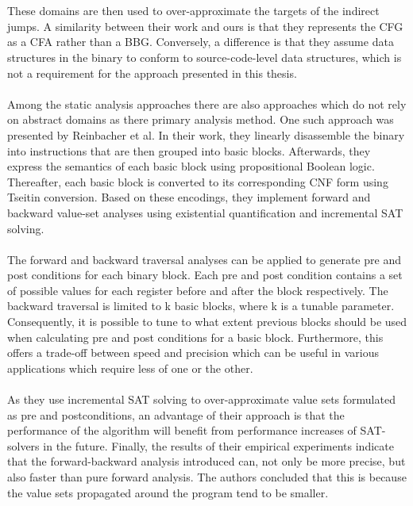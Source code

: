 \documentclass{kththesis}
\begin{document}
\\ \\
These domains are then used to over-approximate the targets of the indirect jumps. A similarity between their work and ours is that they represents the CFG as a CFA rather than a BBG. Conversely, a difference is that they assume data structures in the binary to conform to source-code-level data structures, which is not a requirement for the approach presented in this thesis. 
\\ \\ 
Among the static analysis approaches there are also approaches which do not rely on abstract domains as there primary analysis method. One such approach was presented by Reinbacher et al\cite{preciseCFGBoolean}. In their work, they linearly disassemble the binary into instructions that are then grouped into basic blocks. Afterwards, they express the semantics of each basic block using propositional Boolean logic. Thereafter, each basic block is converted to its corresponding CNF form using Tseitin conversion. Based on these encodings, they implement forward and backward value-set analyses using existential quantification and incremental SAT solving.
\\ \\
The forward and backward traversal analyses can be applied to generate pre and post conditions for each binary block. Each pre and post condition contains a set of possible values for each register before and after the block respectively. The backward traversal is limited to k basic blocks, where k is a tunable parameter. Consequently, it is possible to tune to what extent previous blocks should be used when calculating pre and post conditions for a basic block. Furthermore, this offers a trade-off between speed and precision which can be useful in various applications which require less of one or the other.
\\ \\
As they use incremental SAT solving to over-approximate value sets formulated as pre and postconditions, an advantage of their approach is that the performance of the algorithm will benefit from performance increases of SAT-solvers in the future. Finally, the results of their empirical experiments indicate that the forward-backward analysis introduced can, not only be more precise, but also faster than pure forward analysis. The authors concluded that this is because the value sets propagated around the program tend to be smaller.
\\ \\
\end{document}
